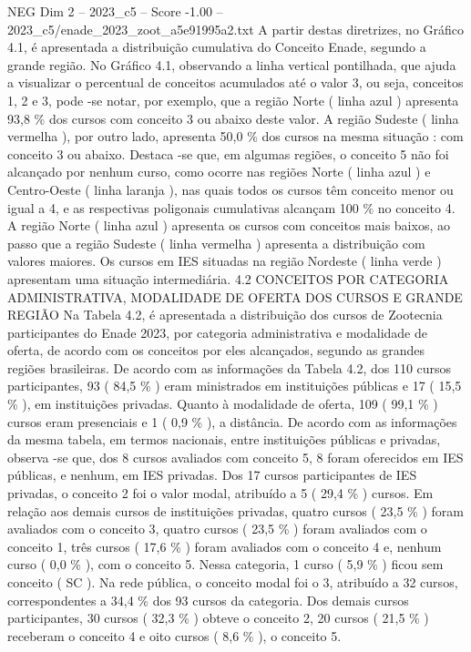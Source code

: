 \begin{textsample}{NEG Dim 2 – 2023\_c5 – Score -1.00 – 2023\_c5/enade\_2023\_zoot\_a5e91995a2.txt}
A partir destas diretrizes, no Gráfico 4.1, é apresentada a distribuição cumulativa do Conceito Enade, segundo a grande região.
No Gráfico 4.1, observando a linha vertical pontilhada, que ajuda a visualizar o percentual de conceitos acumulados até o valor 3, ou seja, conceitos 1, 2 e 3, pode -se notar, por exemplo, que a região Norte ( linha azul ) apresenta 93,8 \% dos cursos com conceito 3 ou abaixo deste valor.
A região Sudeste ( linha vermelha ), por outro lado, apresenta 50,0 \% dos cursos na mesma situação : com conceito 3 ou abaixo.
Destaca -se que, em algumas regiões, o conceito 5 não foi alcançado por nenhum curso, como ocorre nas regiões Norte ( linha azul ) e Centro-Oeste ( linha laranja ), nas quais todos os cursos têm conceito menor ou igual a 4, e as respectivas poligonais cumulativas alcançam 100 \% no conceito 4.
A região Norte ( linha azul ) apresenta os cursos com conceitos mais baixos, ao passo que a região Sudeste ( linha vermelha ) apresenta a distribuição com valores maiores.
Os cursos em IES situadas na região Nordeste ( linha verde ) apresentam uma situação intermediária. 4.2 CONCEITOS POR CATEGORIA ADMINISTRATIVA, MODALIDADE DE OFERTA DOS CURSOS E GRANDE REGIÃO Na Tabela 4.2, é apresentada a distribuição dos cursos de Zootecnia participantes do Enade 2023, por categoria administrativa e modalidade de oferta, de acordo com os conceitos por eles alcançados, segundo as grandes regiões brasileiras.
De acordo com as informações da Tabela 4.2, dos 110 cursos participantes, 93 ( 84,5 \% ) eram ministrados em instituições públicas e 17 ( 15,5 \% ), em instituições privadas.
Quanto à modalidade de oferta, 109 ( 99,1 \% ) cursos eram presenciais e 1 ( 0,9 \% ), a distância.
De acordo com as informações da mesma tabela, em termos nacionais, entre instituições públicas e privadas, observa -se que, dos 8 cursos avaliados com conceito 5, 8 foram oferecidos em IES públicas, e nenhum, em IES privadas.
Dos 17 cursos participantes de IES privadas, o conceito 2 foi o valor modal, atribuído a 5 ( 29,4 \% ) cursos.
Em relação aos demais cursos de instituições privadas, quatro cursos ( 23,5 \% ) foram avaliados com o conceito 3, quatro cursos ( 23,5 \% ) foram avaliados com o conceito 1, três cursos ( 17,6 \% ) foram avaliados com o conceito 4 e, nenhum curso ( 0,0 \% ), com o conceito 5.
Nessa categoria, 1 curso ( 5,9 \% ) ficou sem conceito ( SC ).
Na rede pública, o conceito modal foi o 3, atribuído a 32 cursos, correspondentes a 34,4 \% dos 93 cursos da categoria.
Dos demais cursos participantes, 30 cursos ( 32,3 \% ) obteve o conceito 2, 20 cursos ( 21,5 \% ) receberam o conceito 4 e oito cursos ( 8,6 \% ), o conceito 5.

\end{textsample}
